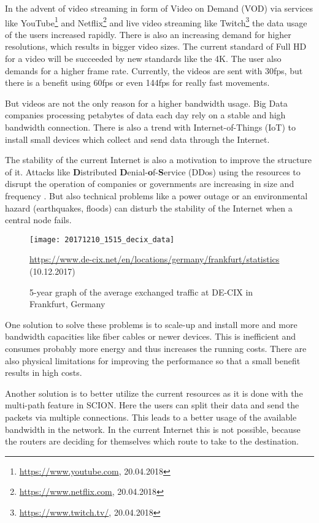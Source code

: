 \documentclass[thesis.tex]{subfiles}
\begin{document}
In the advent of video streaming in form of Video on Demand (VOD) via services like YouTube\footnote{\url{https://www.youtube.com}, 20.04.2018} and Netflix\footnote{\url{https://www.netflix.com}, 20.04.2018} and live video streaming like Twitch\footnote{\url{https://www.twitch.tv/}, 20.04.2018} the data usage of the users increased rapidly. There is also an increasing demand for higher resolutions, which results in bigger video sizes. The current standard of Full HD for a video will be succeeded by new standards like the 4K. The user also demands for a higher frame rate. Currently, the videos are sent with 30fps, but there is a benefit using 60fps or even 144fps for really fast movements.

But videos are not the only reason for a higher bandwidth usage. Big Data companies processing petabytes of data each day rely on a stable and high bandwidth connection. There is also a trend with Internet-of-Things (IoT) to install small devices which collect and send data through the Internet.

The stability of the current Internet is also a motivation to improve the structure of it. Attacks like \textbf{D}istributed \textbf{D}enial-\textbf{o}f-\textbf{S}ervice (DDos) using the resources to disrupt the operation of companies or governments are increasing in size and frequency \cite{GoogleInc.2013}. But also technical problems like a power outage \cite{DECIX.10.04.2018} or an environmental hazard (earthquakes, floods) can disturb the stability of the Internet when a central node fails. 

\begin{figure}
    \centering
    \texttt{[image: 20171210\_1515\_decix\_data]}
    \caption*{\tiny{ \url{https://www.de-cix.net/en/locations/germany/frankfurt/statistics} (10.12.2017)}}
    \caption{5-year graph of the average exchanged traffic at DE-CIX in Frankfurt, Germany}
    \label{fig:intro:decixData}
\end{figure}

One solution to solve these problems is to scale-up and install more and more bandwidth capacities like fiber cables or newer devices. This is inefficient and consumes probably more energy and thus increases the running costs. There are also physical limitations for improving the performance so that a small benefit results in high costs.

Another solution is to better utilize the current resources as it is done with the multi-path feature in SCION. Here the users can split their data and send the packets via multiple connections. This leads to a better usage of the available bandwidth in the network. In the current Internet this is not possible, because the routers are deciding for themselves which route to take to the destination. 
\end{document}

